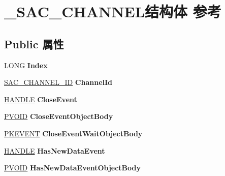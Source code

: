 \hypertarget{struct___s_a_c___c_h_a_n_n_e_l}{}\section{\+\_\+\+S\+A\+C\+\_\+\+C\+H\+A\+N\+N\+E\+L结构体 参考}
\label{struct___s_a_c___c_h_a_n_n_e_l}
\subsection*{Public 属性}
\begin{DoxyCompactItemize}
\item 
\mbox{\label{struct___s_a_c___c_h_a_n_n_e_l_a087715b60425abbbac546e09113abb2b}} 
L\+O\+NG {\bfseries Index}
\item 
\mbox{\label{struct___s_a_c___c_h_a_n_n_e_l_a2e5923389f27c6b8a24dca133f308601}} 
\hyperlink{struct___s_a_c___c_h_a_n_n_e_l___i_d}{S\+A\+C\+\_\+\+C\+H\+A\+N\+N\+E\+L\+\_\+\+ID} {\bfseries Channel\+Id}
\item 
\mbox{\label{struct___s_a_c___c_h_a_n_n_e_l_a414ccd8ce15392c7de8147c24ef7f6c8}} 
\hyperlink{interfacevoid}{H\+A\+N\+D\+LE} {\bfseries Close\+Event}
\item 
\mbox{\label{struct___s_a_c___c_h_a_n_n_e_l_a199efe728c2aea938012efb89f1b61de}} 
\hyperlink{interfacevoid}{P\+V\+O\+ID} {\bfseries Close\+Event\+Object\+Body}
\item 
\mbox{\label{struct___s_a_c___c_h_a_n_n_e_l_af860946de17f7f94aa2f8fad42050ad5}} 
\hyperlink{struct___k_e_v_e_n_t}{P\+K\+E\+V\+E\+NT} {\bfseries Close\+Event\+Wait\+Object\+Body}
\item 
\mbox{\label{struct___s_a_c___c_h_a_n_n_e_l_adf134b20ab1cb8953e9ea3fa4cf91dcf}} 
\hyperlink{interfacevoid}{H\+A\+N\+D\+LE} {\bfseries Has\+New\+Data\+Event}
\item 
\mbox{\label{struct___s_a_c___c_h_a_n_n_e_l_aeb6aedd40ea20c0fe071ca4007eb2b71}} 
\hyperlink{interfacevoid}{P\+V\+O\+ID} {\bfseries Has\+New\+Data\+Event\+Object\+Body}

\end{DoxyCompactItemize}
